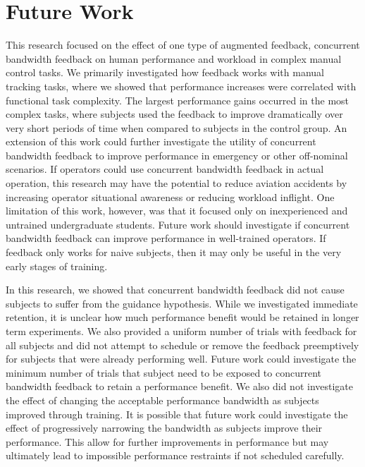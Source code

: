 \section{Future Work}

This research focused on the effect of one type of augmented feedback, concurrent bandwidth feedback on human performance and workload in complex manual control tasks.
We primarily investigated how feedback works with manual tracking tasks, where we showed that performance increases were correlated with functional task complexity.
The largest performance gains occurred in the most complex tasks, where subjects used the feedback to improve dramatically over very short periods of time when compared to subjects in the control group.
An extension of this work could further investigate the utility of concurrent bandwidth feedback to improve performance in emergency or other off-nominal scenarios.
If operators could use concurrent bandwidth feedback in actual operation, this research may have the potential to reduce aviation accidents by increasing operator situational awareness or reducing workload inflight.
One limitation of this work, however, was that it focused only on inexperienced and untrained undergraduate students.
Future work should investigate if concurrent bandwidth feedback can improve performance in well-trained operators.
If feedback only works for naive subjects, then it may only be useful in the very early stages of training.

In this research, we showed that concurrent bandwidth feedback did not cause subjects to suffer from the guidance hypothesis.
While we investigated immediate retention, it is unclear how much performance benefit would be retained in longer term experiments.
We also provided a uniform number of trials with feedback for all subjects and did not attempt to schedule or remove the feedback preemptively for subjects that were already performing well.
Future work could investigate the minimum number of trials that subject need to be exposed to concurrent bandwidth feedback to retain a performance benefit.
We also did not investigate the effect of changing the acceptable performance bandwidth as subjects improved through training.
It is possible that future work could investigate the effect of progressively narrowing the bandwidth as subjects improve their performance.
This allow for further improvements in performance but may ultimately lead to impossible performance restraints if not scheduled carefully.

